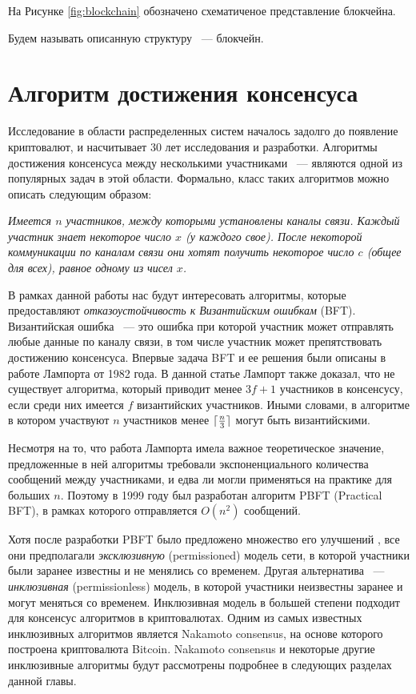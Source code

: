 На Рисунке \ref{fig:blockchain} обозначено схематиченое представление блокчейна.

Будем называть описанную структуру ~--- блокчейн.

\section{Алгоритм достижения консенсуса}
Исследование в области распределенных систем началось задолго до  появление криптовалют, и насчитывает 30 лет исследования и разработки.
Алгоритмы достижения консенсуса между несколькими участниками ~--- являются одной из популярных задач в этой области.
Формально, класс таких алгоритмов можно описать следующим образом:
\par \textit{
Имеется $n$ участников, между которыми установлены каналы связи. Каждый участник знает некоторое число $x$ (у каждого свое).
После некоторой коммуникации по каналам связи они хотят получить некоторое число $c$ (общее для всех),  равное одному из чисел $x$.
}

В рамках данной работы нас будут интересовать алгоритмы, которые предоставляют \textit{отказоустойчивость к Византийским ошибкам} (BFT)\cite{Lamport:1982}.
Византийская ошибка ~--- это ошибка при которой участник может отправлять любые данные по каналу связи, в том числе участник может препятствовать достижению консенсуса.
Впервые задача BFT и ее решения были описаны в работе Лампорта от 1982 года\cite{Lamport:1982}. 
В данной статье Лампорт также доказал, что не существует алгоритма, который приводит менее $3f+1$ участников в консенсусу, если среди них имеется $f$  византийских участников.
Иными словами, в алгоритме в котором участвуют $n$ участников менее $\lceil\frac{n}{3}\rceil$ могут быть византийскими.

Несмотря на то, что работа Лампорта имела важное теоретическое значение, предложенные в ней алгоритмы требовали экспоненциального количества сообщений между участниками, 
и едва ли могли применяться на практике для больших $n$. Поэтому в 1999 году был разработан алгоритм PBFT (Practical BFT)\cite{pbft},  в рамках которого отправляется $O(n^2)$  сообщений.

Хотя после разработки PBFT было предложено множество его улучшений \cite{qu, hq, Zyzzyva}, все они предполагали \textit{эксклюзивную} (permissioned) модель сети, 
в которой участники были заранее известны и не менялись со временем. Другая альтернатива ~--- \textit{инклюзивная} (permissionless) модель, в которой участники
неизвестны заранее и могут меняться со временем. Инклюзивная модель в большей степени подходит для консенсус алгоритмов в криптовалютах. Одним из самых известных инклюзивных алгоритмов является Nakamoto consensus\cite{nakamoto}, на основе которого построена криптовалюта Bitcoin. Nakamoto consensus и некоторые другие инклюзивные алгоритмы будут рассмотрены подробнее в следующих разделах данной главы.


